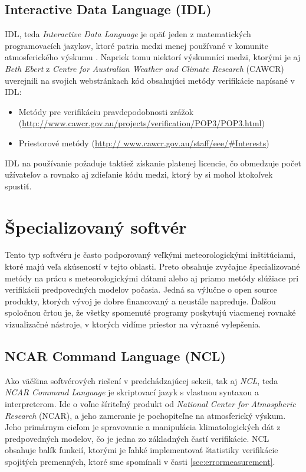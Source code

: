 \subsection[IDL]{Interactive Data Language (IDL)}
IDL, teda \textit{Interactive Data Language} \cite{IDL} je opäť jeden z matematických programovacích jazykov, ktoré patria medzi menej používané v komunite atmosferického výskumu \cite{VerifSoft}. Napriek tomu niektorí výskumníci medzi, ktorými je aj \textit{Beth Ebert} z \textit{Centre for Australian Weather and Climate Research} (CAWCR) uverejnili na svojich webstránkach kód obsahujúci metódy verifikácie napísané v IDL:
\begin{itemize}
	\item Metódy pre verifikáciu pravdepodobnosti zrážok 	(\url{http://www.cawcr.gov.au/projects/verification/POP3/POP3.html})
	\item Priestorové metódy (\url{http://
		www.cawcr.gov.au/staff/eee/#Interests})
\end{itemize} 
IDL na používanie požaduje taktiež získanie platenej licencie, čo obmedzuje počet užívateľov a rovnako aj zdieľanie kódu medzi, ktorý by si mohol ktokoľvek spustiť.


\section{Špecializovaný softvér}

Tento typ softvéru je často podporovaný veľkými meteorologickými inštitúciami, ktoré majú veľa skúseností v tejto oblasti. Preto  obsahuje zvyčajne špecializované metódy na prácu s meteorologickými dátami alebo aj priamo metódy slúžiace pri verifikácii predpovedných modelov počasia. Jedná sa výlučne o open source produkty, ktorých vývoj je dobre financovaný a neustále napreduje. Ďalšou spoločnou črtou je, že všetky spomenuté programy poskytujú viacmenej rovnaké vizualizačné nástroje, v ktorých vidíme priestor na výrazné vylepšenia.

\subsection[NCL]{NCAR Command Language (NCL)}
Ako väčšina softvérových riešení v predchádzajúcej sekcii, tak aj \textit{NCL}, teda \textit{NCAR Command Language} \cite{NCL} je skriptovací jazyk s vlastnou syntaxou a interpreterom. Ide o voľne šíriteľný produkt od \textit{National Center for Atmospheric Research} (NCAR), a jeho zameranie je pochopiteľne na atmosferický výskum. Jeho primárnym cieľom je spravovanie a manipulácia klimatologických dát z predpovedných modelov, čo je jedna zo základných častí verifikácie. NCL obsahuje balík funkcií, ktorými je ľahké implementovať štatistiky verifikácie spojitých premenných, ktoré sme spomínali v časti \ref{sec:errormeasurement}. 

